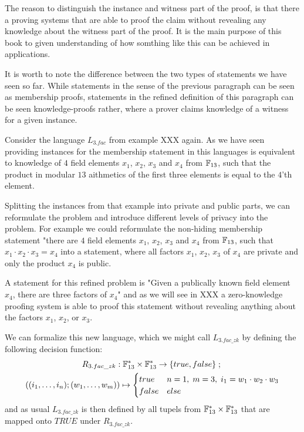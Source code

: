 The reason to distinguish the instance and witness part of the proof, is that there a proving systems that are able to proof the claim without revealing any knowledge about the witness part of the proof. It is the main purpose of this book to given understanding of how somthing like this can be achieved in applications.

It is worth to note the difference between the two types of statements we have seen so far. While statements in the sense of the previous paragraph can be seen as membership proofs, statements in the refined definition of this paragraph can be seen knowledge-proofs rather, where a prover claims knowledge of a witness for a given instance.
\begin{example}[3-factorization]
Consider the language $L_{3.fac}$ from example XXX again. As we have seen providing instances for the membership statement in this languages is equivalent to knowledge of $4$ field elements $x_1$, $x_2$, $x_3$ and $x_4$ from $\mathbb{F}_{13}$, such that the product in modular $13$ aithmetics of the first three elements is equal to the $4$'th element. 

Splitting the instances from that example into private and public parts, we can reformulate the problem and introduce different levels of privacy into the problem. For example we could reformulate the non-hiding membership statement "there are $4$ field elements $x_1$, $x_2$, $x_3$ and $x_4$ from $\mathbb{F}_{13}$, such that $x_1\cdot x_2\cdot x_3 = x_4$ into a statement, where all factors $x_1$, $x_2$, $x_3$ of $x_4$ are private and only the product $x_4$ is public. 

A statement for this refined problem is "Given a publically known field element $x_4$, there are three factors of $x_4$" and as we will see in XXX a zero-knowledge proofing system is able to proof this statement without revealing anything about the factors $x_1$, $x_2$, or $x_3$.

We can formalize this new language, which we might call $L_{3.fac\_zk}$ by defining the following decision function: 
\begin{multline*}
R_{3.fac\_zk} : \mathbb{F}_{13}^* \times \mathbb{F}_{13}^* \to \{true, false\}\;;\;\\
((i_1,\ldots,i_n);(w_1,\ldots, w_m)) \mapsto
\begin{cases}
true & n=1,\; m=3,\; i_1 = w_1\cdot w_2 \cdot w_3\\
false & else
\end{cases}
\end{multline*}
and as usual $L_{3.fac\_zk}$ is then defined by all tupels from $\mathbb{F}_{13}^* \times \mathbb{F}_{13}^*$ that are mapped onto $TRUE$ under $R_{3.fac\_zk}$. 


\end{example}
